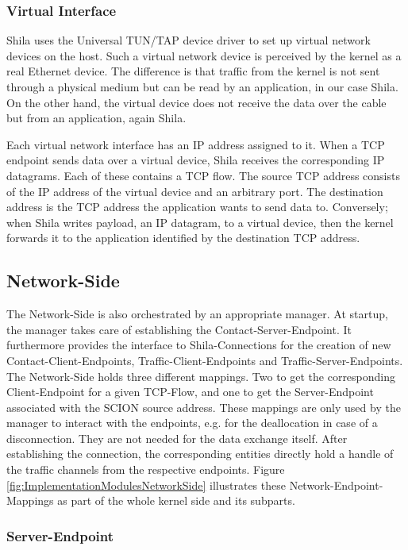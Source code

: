 \subsubsection{Virtual Interface}

Shila uses the Universal TUN/TAP device driver \cite{TUNTAPDriver} to set up virtual network devices on the host. Such a virtual network device is perceived by the kernel as a real Ethernet device. The difference is that traffic from the kernel is not sent through a physical medium but can be read by an application, in our case Shila. On the other hand, the virtual device does not receive the data over the cable but from an application, again Shila.

Each virtual network interface has an IP address assigned to it. When a TCP endpoint sends data over a virtual device, Shila receives the corresponding IP datagrams. Each of these contains a TCP flow. The source TCP address consists of the IP address of the virtual device and an arbitrary port. The destination address is the TCP address the application wants to send data to. Conversely; when Shila writes payload, an IP datagram, to a virtual device, then the kernel forwards it to the application identified by the destination TCP address.  

\subsection{Network-Side}

The Network-Side is also orchestrated by an appropriate manager. At startup, the manager takes care of establishing the Contact-Server-Endpoint. It furthermore provides the interface to Shila-Connections for the creation of new Contact-Client-Endpoints, Traffic-Client-Endpoints and Traffic-Server-Endpoints. The Network-Side holds three different mappings. Two to get the corresponding Client-Endpoint for a given TCP-Flow, and one to get the Server-Endpoint associated with the SCION source address. These mappings are only used by the manager to interact with the endpoints, e.g. for the deallocation in case of a disconnection. They are not needed for the data exchange itself. After establishing the connection, the corresponding entities directly hold a handle of the traffic channels from the respective endpoints. Figure \ref{fig:ImplementationModulesNetworkSide} illustrates these Network-Endpoint-Mappings as part of the whole kernel side and its subparts.  

\subsubsection{Server-Endpoint}


